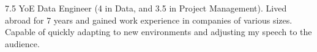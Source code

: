 

\begin{cvparagraph}

7.5 YoE Data Engineer (4 in Data, and 3.5 in Project Management). 
Lived abroad for 7 years and gained work experience in companies of various sizes. Capable of quickly adapting to new environments and adjusting my speech to the audience.\end{cvparagraph}

